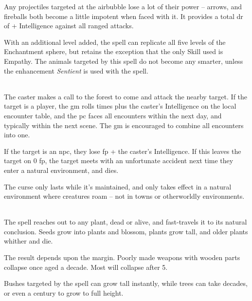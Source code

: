 \begin{multicols}{2}
Any projectiles targeted at the airbubble lose a lot of their power -- arrows, and fireballs both become a little impotent when faced with it.
It provides a total \gls{dr} of  + Intelligence against all ranged attacks.


With an additional level added, the spell can replicate all five levels of the Enchantment sphere, but retains the exception that the only Skill used is Empathy.
The animals targeted by this spell do not become any smarter, unless the enhancement \textit{Sentient} is used with the spell.

\spelllevel

\\
\label{forestsCall}%
The caster makes a call to the forest to come and attack the nearby target.
If the target is a player, the \gls{gm} rolls  times plus the caster's Intelligence on the local encounter table, and the \gls{pc} faces all encounters within the next day, and typically within the next scene.
The \gls{gm} is encouraged to combine all encounters into one.

If the target is an \gls{npc}, they lose  \gls{fp} + the caster's Intelligence.
If this leaves the target on 0 \gls{fp}, the target meets with an unfortunate accident next time they enter a natural environment, and dies.

The curse only lasts while it's maintained, and only takes effect in a natural environment where creatures roam -- not in towns or otherworldly environments.

\\
The spell reaches out to any plant, dead or alive, and fast-travels it to its natural conclusion.
Seeds grow into plants and blossom, plants grow tall, and older plants whither and die.

The result depends upon the margin.
Poorly made weapons with wooden parts collapse once aged a decade.
Most will collapse after 5.

Bushes targeted by the spell can grow tall instantly, while trees can take decades, or even a century to grow to full height.

\sidebox[23]{

  \begin{rollchart}


\end{rollchart}}
\end{multicols}
